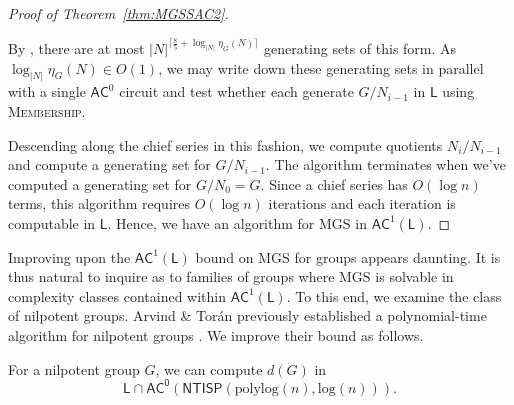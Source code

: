\documentclass{article}
\newcommand{\algprobm}[1]{\textsc{#1}\xspace}
\newcommand*{\ComplexityClass}[1]{\ensuremath{\mathsf{#1}}\xspace}
\newcommand{\NTISP}{\ComplexityClass{NTISP}}
\newcommand{\NTISPpll}{\ensuremath{\NTISP(\mathrm{polylog}(n),\mathrm{log}(n))}\xspace}
\newcommand*{\LogSpace}{\ComplexityClass{L}}
\newcommand{\AC}{\ComplexityClass{AC}}
\newcommand{\ACz}{\ComplexityClass{AC^0}}
\begin{document}
\begin{proof}[Proof of Theorem~\ref{thm:MGSSAC2}]
\begin{itemize}
By \cite[Corollary 13]{LucchiniThakkar}, there are at most $\lvert N \rvert ^{\lceil \frac{8}{5} + \log_{\lvert N \rvert}\eta_G(N)  \rceil }$ generating sets of this form. As $\log_{|N|} \eta_{G}(N) \in O(1)$, we may write down these generating sets in parallel with a single $\AC^0$ circuit and test whether each generate $G/N_{i-1}$ in $\LogSpace$ using \algprobm{Membership}.
\end{itemize}

\noindent Descending along the chief series in this fashion, we compute quotients $N_i / N_{i-1}$ and compute a generating set for $G/N_{i-1}$. The algorithm terminates when we've computed a generating set for $G/N_0 = G$. Since a chief series has $O(\log n)$ terms, this algorithm requires $O(\log n)$ iterations and each iteration is computable in $\LogSpace$. Hence, we have an algorithm for \algprobm{MGS} in $\AC^1(\LogSpace)$.
\end{proof}


Improving upon the $\AC^{1}(\LogSpace)$ bound on \algprobm{MGS} for groups appears daunting. It is thus natural to inquire as to families of groups where \algprobm{MGS} is solvable in complexity classes contained within $\AC^{1}(\LogSpace)$. To this end, we examine the class of nilpotent groups. Arvind \& Tor\'an previously established a polynomial-time algorithm for nilpotent groups \cite[Theorem~7]{ArvindToran}. We improve their bound as follows.

\begin{proposition} \label{prop:Nilpotent}
For a nilpotent group $G$, we can compute $d(G)$ in
\[
\LogSpace \cap \ACz(\NTISPpll).
\]
\end{proposition}
\end{document}

